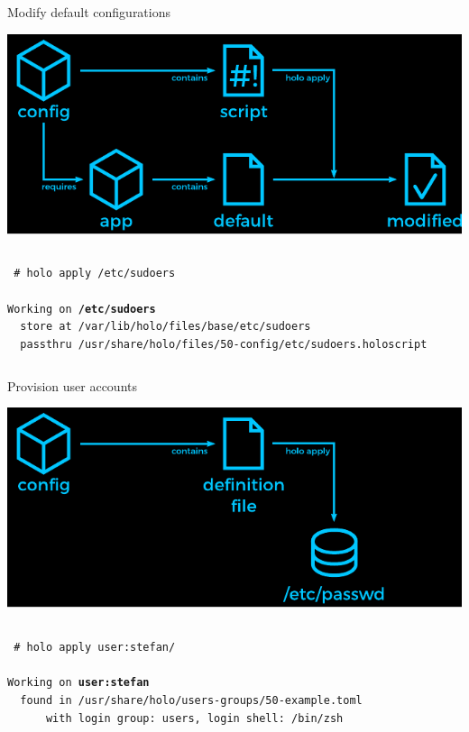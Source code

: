 \documentclass{beamer}
\begin{document}
\begin{frame}[plain,t]{Modify default configurations}
 \vspace{-1em}\begin{center}
  \includegraphics[width=\linewidth]{diagram-files4.pdf}
 \end{center}
 \begin{columns}\column{\dimexpr\paperwidth-15pt}
  \small\texttt{%
   {\color{holoonblack}\#} holo apply /etc/sudoers\\
   ~\\
   Working on \textbf{/etc/sudoers}\\
   ~~store at /var/lib/holo/files/base/etc/sudoers\\
   ~~passthru~/usr/share/holo/files/50-config/etc/sudoers.holoscript
  }
 \end{columns}
\end{frame}

\begin{frame}[plain,t]{Provision user accounts}
 \vspace{-1em}\begin{center}
  \includegraphics[width=\linewidth]{diagram-users.pdf}
 \end{center}
 \begin{columns}\column{\dimexpr\paperwidth-15pt}
  \small\texttt{%
   {\color{holoonblack}\#} holo apply user:stefan\phantom/\\
   ~\\
   Working on \textbf{user:stefan}\\
   ~~found in /usr/share/holo/users-groups/50-example.toml\\
   ~~~~~~with login group: users, login shell: /bin/zsh
  }
 \end{columns}
\end{frame}
\end{document}
